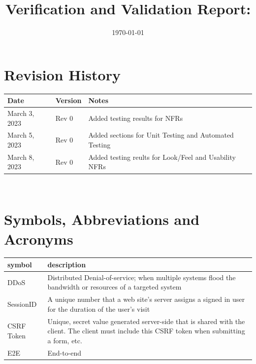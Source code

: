 \documentclass[12pt, titlepage]{article}
\begin{document}
\title{Verification and Validation Report: \progname} 
\author{\authname}
\date{\today}
	
\maketitle


\section{Revision History}

\begin{tabularx}{\textwidth}{p{3cm}p{2cm}X}
\toprule {\bf Date} & {\bf Version} & {\bf Notes}\\
\midrule
March 3, 2023 & Rev 0 & Added testing results for NFRs\\
March 5, 2023 & Rev 0 & Added sections for Unit Testing and Automated Testing \\
March 8, 2023 & Rev 0 & Added testing reults for Look/Feel and Usability NFRs\\
\bottomrule
\end{tabularx}

~\newpage

\section{Symbols, Abbreviations and Acronyms}

\renewcommand{\arraystretch}{1.2}
\begin{tabularx}{\textwidth}{l X}
  \toprule		
  \textbf{symbol} & \textbf{description}\\
  \midrule 
  DDoS & Distributed Denial-of-service; when multiple systems flood the bandwidth or resources of a targeted system\\
  SessionID & A unique number that a web site's server assigns a signed in user for the duration of the user's visit\\
  CSRF Token & Unique, secret value generated server-side that is shared with the client. The client must include this CSRF token when submitting a form, etc.\\
  E2E & End-to-end \\
  \bottomrule
\end{tabularx}\\

\newpage

\tableofcontents
\end{document}
